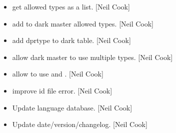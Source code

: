 \documentclass[a4paper,10pt,english]{report}
\begin{document}
\begin{itemize}
\item {} 
 \sphinxhyphen{} get allowed types as a
list. {[}Neil Cook{]}

\item {} 
 \sphinxhyphen{} add  to
dark master allowed types. {[}Neil Cook{]}

\item {} 
 \sphinxhyphen{} add dprtype to dark table. {[}Neil Cook{]}

\item {} 
 \sphinxhyphen{} allow dark master to use
multiple  types. {[}Neil Cook{]}

\item {} 
 \sphinxhyphen{} allow  to
use  and . {[}Neil Cook{]}

\item {} 
 \sphinxhyphen{} improve id file error. {[}Neil Cook{]}

\item {} 
Update language database. {[}Neil Cook{]}

\item {} 
Update date/version/changelog. {[}Neil Cook{]}

\end{itemize}
\end{document}
